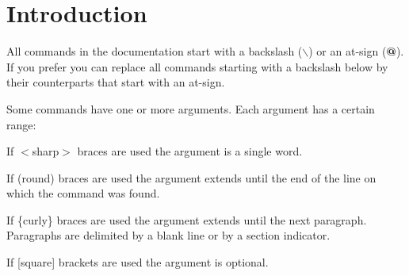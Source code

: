 \hypertarget{commands_cmd_intro}{}\section{Introduction}\label{commands_cmd_intro}
All commands in the documentation start with a backslash ({\bfseries $\backslash$}) or an at-\/sign ({\bfseries @}). If you prefer you can replace all commands starting with a backslash below by their counterparts that start with an at-\/sign.

Some commands have one or more arguments. Each argument has a certain range: 
\begin{DoxyItemize}
\item If $<$sharp$>$ braces are used the argument is a single word. 
\item If (round) braces are used the argument extends until the end of the line on which the command was found. 
\item If \{curly\} braces are used the argument extends until the next paragraph. Paragraphs are delimited by a blank line or by a section indicator. 
\end{DoxyItemize}If \mbox{[}square\mbox{]} brackets are used the argument is optional.

